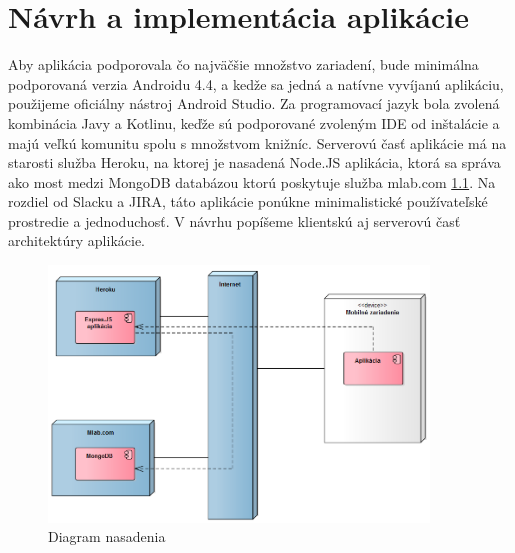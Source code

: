 \chapter{Návrh a implementácia aplikácie}

Aby aplikácia podporovala čo najväčšie množstvo zariadení, bude minimálna podporovaná verzia Androidu 4.4, a kedže sa jedná a natívne vyvíjanú aplikáciu, použijeme oficiálny nástroj Android Studio.  Za programovací jazyk bola zvolená kombinácia Javy a Kotlinu, keďže sú podporované zvoleným IDE od inštalácie a majú veľkú komunitu spolu s množstvom knižníc. Serverovú časť aplikácie má na starosti služba Heroku, na ktorej je nasadená Node.JS aplikácia, ktorá sa správa ako most medzi MongoDB databázou ktorú poskytuje služba mlab.com \ref{obr3.4}. Na rozdiel od Slacku a JIRA, táto aplikácie ponúkne minimalistické používateľské prostredie a jednoduchosť. V návrhu popíšeme klientskú aj serverovú časť architektúry aplikácie.


\vspace{10pt}
\begin{figure}[H]
    \begin{center}
        \begin{minipage}{0.9\linewidth}
            \begin{center}
                \includegraphics[width=0.9\textwidth]{images/deploy.png}
                \caption{Diagram nasadenia}
                \label{obr3.4}
            \end{center}
        \end{minipage}
    \end{center}
\end{figure}
\vspace{10pt}



